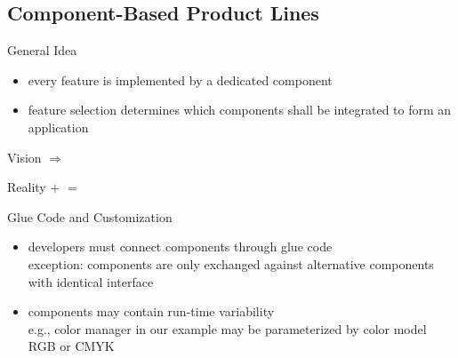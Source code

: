 \subsection{Component-Based Product Lines}
\begin{frame}[label=SPLwithComponents]{\myframetitle} %
	\begin{mycolumns}[t,widths={40}]
		\begin{definition}{General Idea}					
			\begin{itemize}
				\item every feature is implemented by a dedicated component
				\item feature selection determines which components shall be integrated to form an application
			\end{itemize}
		\end{definition}
		\begin{example}{Vision}
				\vspace*{\fill}
					$\Longrightarrow$ 
				\vspace*{\fill}	
		\end{example}
	\mynextcolumn
		\begin{example}{Reality}
				\vspace*{\fill}
					$+$ 
				\vspace*{\fill}	
				\vspace*{\fill}
					$=$ 
				\vspace*{\fill}	
		\end{example}		
		\begin{note}{Glue Code and Customization}
			\begin{itemize}
				\item developers must connect components through glue code\\exception: components are only exchanged against alternative components with identical interface
				\item components may contain run-time variability\\e.g., color manager in our example may be parameterized by color model RGB or CMYK
			\end{itemize}
		\end{note}
	\end{mycolumns}	
\end{frame}

